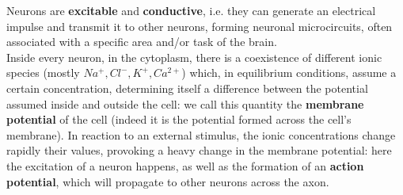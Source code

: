 \documentclass[a4paper]{article}
\begin{document}
	Neurons are \textbf{excitable} and \textbf{conductive}, i.e. they can generate an electrical impulse and transmit it to other neurons, forming neuronal microcircuits, often associated with a specific area and/or task of the brain. \\
	Inside every neuron, in the cytoplasm, there is a coexistence of different ionic species (mostly $Na^+, Cl^-, K^+, Ca^{2+}$) which, in equilibrium conditions, assume a certain concentration, determining itself a difference between the potential assumed inside and outside the cell: we call this quantity the \textbf{membrane potential} of the cell (indeed it is the potential formed across the cell's membrane).  In reaction to an external stimulus, the ionic concentrations change rapidly their values, provoking a heavy change in the membrane potential: here the excitation of a neuron happens, as well as the formation of an \textbf{action potential}, which will propagate to other neurons across the axon. 
\end{document}

